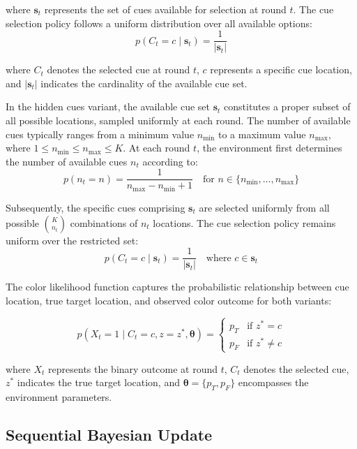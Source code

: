 \documentclass{article}
\begin{document}
where $\mathbf{s}_t$ represents the set of cues available for selection at round $t$. The cue selection policy follows a uniform distribution over all available options:
\begin{equation}
p(C_t = c \mid \mathbf{s}_t) = \frac{1}{|\mathbf{s}_t|}
\end{equation}

where $C_t$ denotes the selected cue at round $t$, $c$ represents a specific cue location, and $|\mathbf{s}_t|$ indicates the cardinality of the available cue set.

In the hidden cues variant, the available cue set $\mathbf{s}_t$ constitutes a proper subset of all possible locations, sampled uniformly at each round. The number of available cues typically ranges from a minimum value $n_{\min}$ to a maximum value $n_{\max}$, where $1 \leq n_{\min} \leq n_{\max} \leq K$. At each round $t$, the environment first determines the number of available cues $n_t$ according to:
\begin{equation}
p(n_t = n) = \frac{1}{n_{\max} - n_{\min} + 1} \quad \text{for } n \in \{n_{\min}, \ldots, n_{\max}\}
\end{equation}

Subsequently, the specific cues comprising $\mathbf{s}_t$ are selected uniformly from all possible $\binom{K}{n_t}$ combinations of $n_t$ locations. The cue selection policy remains uniform over the restricted set:
\begin{equation}
p(C_t = c \mid \mathbf{s}_t) = \frac{1}{|\mathbf{s}_t|} \quad \text{where } c \in \mathbf{s}_t
\end{equation}

The color likelihood function captures the probabilistic relationship between cue location, true target location, and observed color outcome for both variants:

\begin{equation}
p(X_t = 1 \mid C_t = c, z = z^*, \boldsymbol{\theta}) = \begin{cases}
p_T & \text{if } z^* = c \\
p_F & \text{if } z^* \neq c
\end{cases}
\end{equation}

where $X_t$ represents the binary outcome at round $t$, $C_t$ denotes the selected cue, $z^*$ indicates the true target location, and $\boldsymbol{\theta} = \{p_T, p_F\}$ encompasses the environment parameters.

\subsection{Sequential Bayesian Update}
\end{document}
